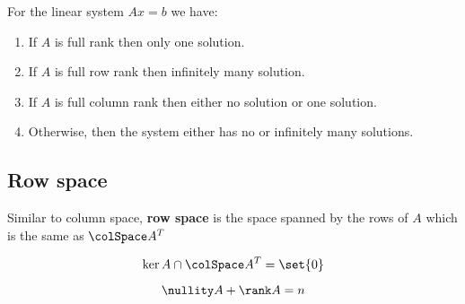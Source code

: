 \begin{proposition}
    For the linear system \(Ax = b\) we have:
    \begin{enumerate}
        \item If \(A\) is full rank then only one solution.
        \item If \(A\) is full row rank then infinitely many solution.
        \item If \(A\) is full column rank then either no solution or one solution.
        \item Otherwise, then the system either has no or infinitely many solutions.
    \end{enumerate}
\end{proposition}

\subsection{Row space}
Similar to column space, \textbf{row space} is the space spanned by the rows of \(A\) which is the same as \(\colSpace A^T\)

\begin{proposition}
    \begin{equation*}
        \ker A \cap \colSpace A^T = \set{0}
    \end{equation*}
\end{proposition}

\begin{theorem}
    \begin{equation*}
        \nullity A + \rank A = n
    \end{equation*}
\end{theorem}